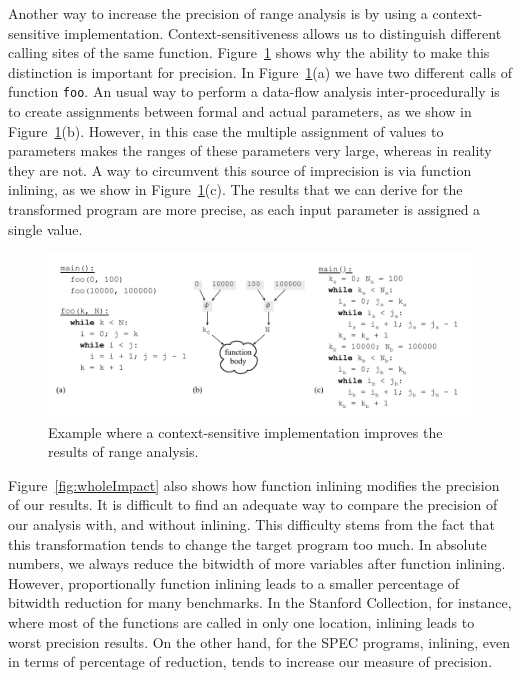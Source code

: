 \documentclass{paper}
\begin{document}
Another way to increase the precision of range analysis is by using a
context-sensitive implementation.
Context-sensitiveness allows us to distinguish different calling sites of
the same function.
Figure~\ref{fig:context} shows why the ability to make this distinction is
important for precision.
In Figure~\ref{fig:context}(a) we have two different calls of function
\texttt{foo}.
An usual way to perform a data-flow analysis inter-procedurally is to
create assignments between formal and actual parameters, as we show in
Figure~\ref{fig:context}(b).
However, in this case the multiple assignment of values to parameters
makes the ranges of these parameters very large, whereas in reality they
are not.
A way to circumvent this source of imprecision is via function inlining,
as we show in Figure~\ref{fig:context}(c).
The results that we can derive for the transformed program are more
precise, as each input parameter is assigned a single value.

\begin{figure}[t!]
\begin{center}
\includegraphics[width=\textwidth]{images/context}
\end{center}
\caption{\label{fig:context}
Example where a context-sensitive implementation improves the results of
range analysis.
}
\end{figure}

Figure~\ref{fig:wholeImpact} also shows how function inlining modifies the
precision of our results.
It is difficult to find an adequate way to compare the precision of
our analysis with, and without inlining.
This difficulty stems from the fact that this transformation tends to change
the target program too much.
In absolute numbers, we always reduce the bitwidth of more variables after
function inlining.
However, proportionally function inlining leads to a smaller percentage of
bitwidth reduction for many benchmarks.
In the Stanford Collection, for instance, where most of the functions are
called in only one location, inlining leads to worst precision results.
On the other hand, for the SPEC programs, inlining, even in terms of
percentage of reduction, tends to increase our measure of precision.
\end{document}
